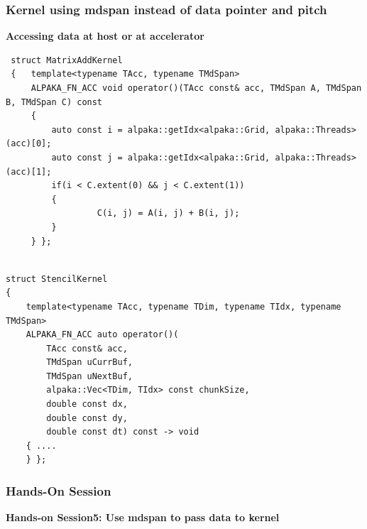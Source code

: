 \documentclass[9pt]{beamer}
\begin{document}
\begin{frame} [fragile]
\frametitle{Kernel using mdspan instead of data pointer and pitch}
\lstset{basicstyle=\ttfamily\tiny}

\textbf{Accessing data at host or at accelerator}
 \lstset{basicstyle=\ttfamily\scriptsize}
 \begin{lstlisting}
 struct MatrixAddKernel
 {   template<typename TAcc, typename TMdSpan>
     ALPAKA_FN_ACC void operator()(TAcc const& acc, TMdSpan A, TMdSpan B, TMdSpan C) const
     {
         auto const i = alpaka::getIdx<alpaka::Grid, alpaka::Threads>(acc)[0];
         auto const j = alpaka::getIdx<alpaka::Grid, alpaka::Threads>(acc)[1];
         if(i < C.extent(0) && j < C.extent(1))
         {
                  C(i, j) = A(i, j) + B(i, j);
         }
     } };
 \end{lstlisting}
\begin{lstlisting}

struct StencilKernel
{
    template<typename TAcc, typename TDim, typename TIdx, typename TMdSpan>
    ALPAKA_FN_ACC auto operator()(
        TAcc const& acc,
        TMdSpan uCurrBuf,
        TMdSpan uNextBuf,
        alpaka::Vec<TDim, TIdx> const chunkSize,
        double const dx,
        double const dy,
        double const dt) const -> void
    { ....
    } };

\end{lstlisting}
\end{frame}

\begin{frame}
\frametitle{Hands-On Session}
\begin{center}
      \Huge \textbf{Hands-on Session5: Use mdspan to pass data to kernel}
  \end{center}
\end{frame}
%
\end{document}
